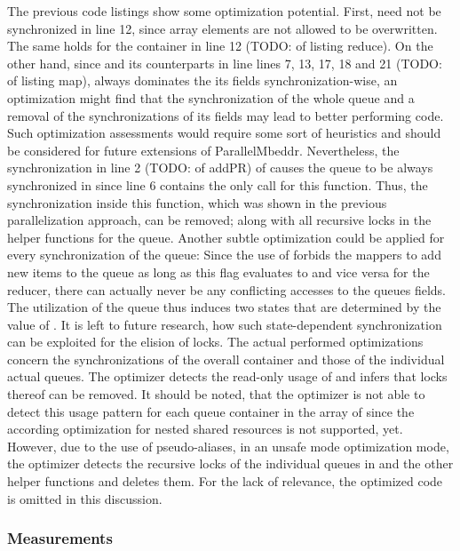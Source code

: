 The previous code listings show some optimization potential. First,  need not be synchronized in line 12, since array elements are not allowed to be overwritten. The same holds for the container  in line 12 (TODO: of listing reduce). On the other hand, since  and its counterparts in line lines 7, 13, 17, 18 and 21 (TODO: of listing map), always dominates the its fields synchronization-wise, an optimization might find that the synchronization of the whole queue and a removal of the synchronizations of its fields may lead to better performing code. Such optimization assessments would require some sort of heuristics and should be considered for future extensions of ParallelMbeddr. Nevertheless, the synchronization in line 2 (TODO: of addPR) of  causes the queue to be always synchronized in  since line 6 contains the only call for this function. Thus, the synchronization inside this function, which was shown in the previous parallelization approach, can be removed; along with all recursive locks in the helper functions for the queue. Another subtle optimization could be applied for every synchronization of the queue: Since the use of  forbids the mappers to add new items to the queue as long as this flag evaluates to  and vice versa for the reducer, there can actually never be any conflicting accesses to the queues fields. The utilization of the queue thus induces two states that are determined by the value of . It is left to future research, how such state-dependent synchronization can be exploited for the elision of locks. The actual performed optimizations concern the synchronizations of the overall  container and those of the individual actual queues. The optimizer detects the read-only usage of  and infers that locks thereof can be removed. It should be noted, that the optimizer is not able to detect this usage pattern for each queue container in the array of  since the according optimization for nested shared resources is not supported, yet. However, due to the use of pseudo-aliases, in an unsafe mode optimization mode, the optimizer detects the recursive locks of the individual queues in  and the other helper functions and deletes them. For the lack of relevance, the optimized code is omitted in this discussion.

\subsubsection{Measurements}

